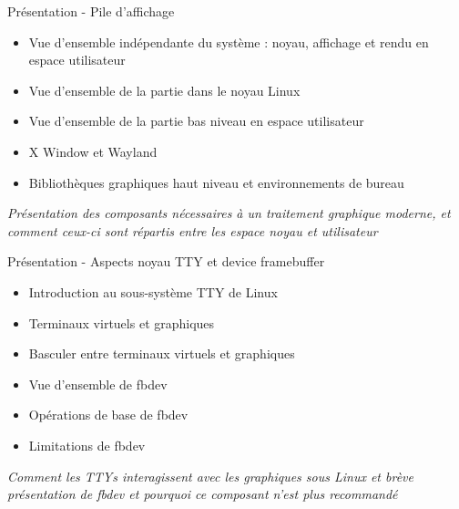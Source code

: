 \documentclass[a4paper,12pt,obeyspaces,spaces,hyphens]{article}
\begin{document}
\feagendatwocolumn
{Présentation - Pile d'affichage}
{
  \begin{itemize}
  \item Vue d'ensemble indépendante du système : noyau, affichage et
        rendu en espace utilisateur
  \item Vue d'ensemble de la partie dans le noyau Linux
  \item Vue d'ensemble de la partie bas niveau en espace utilisateur
  \item X Window et Wayland
  \item Bibliothèques graphiques haut niveau et environnements de bureau
  \end{itemize}
  \vspace{0.5em}
  {\em Présentation des composants nécessaires à un traitement graphique
       moderne, et comment ceux-ci sont répartis entre les espace noyau et
       utilisateur}
}
{Présentation - Aspects noyau TTY et device framebuffer}
{
  \begin{itemize}
  \item Introduction au sous-système TTY de Linux
  \item Terminaux virtuels et graphiques
  \item Basculer entre terminaux virtuels et graphiques
  \end{itemize}
  \vspace{0.5em}
  \begin{itemize}
  \item Vue d'ensemble de fbdev
  \item Opérations de base de fbdev
  \item Limitations de fbdev
  \end{itemize}
  \vspace{0.5em}
  {\em Comment les TTYs interagissent avec les graphiques sous Linux et
       brève présentation de fbdev et pourquoi ce composant n'est plus
       recommandé}
}
\\
\end{document}
